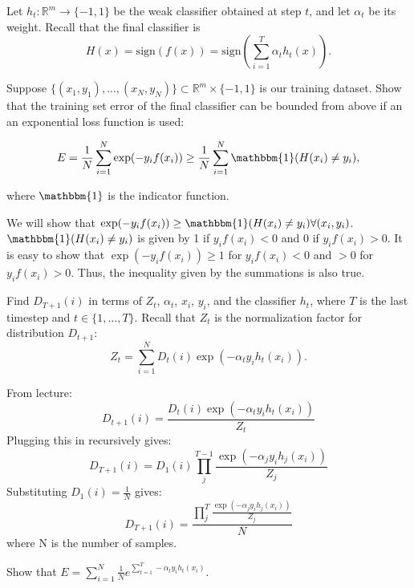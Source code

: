 \problem[3]
Let $h_t: \mathbb{R}^m \rightarrow \{-1,1\}$ be the weak classifier obtained at step $t$, and let $\alpha_t$ be
its weight. Recall that the final classifier is $$H(x) = \text{sign}(f(x)) = \text{sign} \left(\sum\limits_{i=1}^T \alpha_{t}h_t(x) \right).$$

Suppose $\{(x_1, y_1), ..., (x_N, y_N)\} \subset \mathbb{R}^m \times \{-1,1\}$ is our training dataset.  Show that the training set error of the final classifier can be bounded from
above if an an exponential loss function is used:

$$E = \frac{1}{N} \sum\limits_{i=1}^N \exp(-y_{i}f(x_i)) \geq \frac{1}{N} \sum\limits_{i=1}^N \mathbbm{1}(H(x_i) \neq y_i),$$

where $\mathbbm{1}$ is the indicator function.

\begin{solution}
    We will show that $\exp(-y_{i}f(x_i)) \ge \mathbbm{1}(H(x_i) \neq y_i) \forall (x_i, y_i)$. $\mathbbm{1}(H(x_i) \neq y_i)$ is given by 1 if $y_{i}f(x_i) < 0$ and 0 if $y_{i}f(x_i) > 0$. It is easy to show that $\exp(-y_{i}f(x_i)) \ge 1$ for $y_{i}f(x_i) < 0$ and $ > 0$ for $y_{i}f(x_i) > 0$. Thus, the inequality given by the summations is also true.
\end{solution}

\problem[3]
Find $D_{T + 1}(i)$ in terms of $Z_t$, $\alpha_t$, $x_i$, $y_i$, and the classifier $h_t$, where $T$ is the last timestep and $t \in \{1, \ldots, T\}$. Recall that $Z_t$ is the normalization factor for distribution $D_{t+1}$:
$$Z_t = \sum\limits_{i=1}^N D_t(i) \exp(-\alpha_{t}y_{i}h_{t}(x_{i})).$$

\begin{solution}
     From lecture:
     \begin{equation}
         D_{t+1}(i) = \frac{D_t(i)\exp{(-\alpha_ty_ih_t(x_i))}}{Z_t}
     \end{equation}
     Plugging this in recursively gives:
    \begin{equation}
        D_{T+1}(i) =D_1(i)\prod_j^{T-1}\frac{\exp{(-\alpha_jy_ih_j(x_i))}}{Z_j}
    \end{equation}
    Substituting $D_1(i)=\frac{1}{N}$ gives:
    \begin{equation}
        D_{T+1}(i) =\frac{\prod_j^{T}\frac{\exp{(-\alpha_jy_ih_j(x_i))}}{Z_j}}{N}
    \end{equation}
    where N is the number of samples.
\end{solution}

\problem[2]
Show that $E = \sum_{i=1}^N  \frac{1}{N} e^{\sum_{t=1}^T -\alpha_t y_i h_t(x_i)}.$

